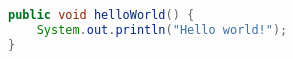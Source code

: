 \begin{lstlisting}[language=Java,caption={Hello World}]
public void helloWorld() {
	System.out.println("Hello world!");
}
\end{lstlisting}